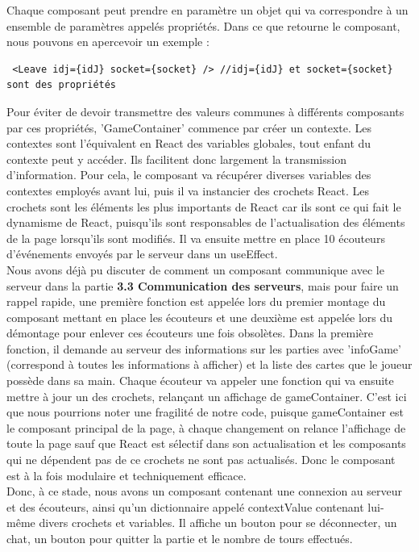\documentclass[a4paper]{article}
\begin{document}
Chaque composant peut prendre en paramètre un objet qui va correspondre à un ensemble de paramètres appelés propriétés. Dans ce que retourne le composant, nous pouvons en apercevoir un exemple :
\begin{verbatim}
 <Leave idj={idJ} socket={socket} /> //idj={idJ} et socket={socket} sont des propriétés
\end{verbatim}

Pour éviter de devoir transmettre des valeurs communes à différents composants par ces propriétés, 'GameContainer' commence par créer un contexte. Les contextes sont l'équivalent en React des variables globales, tout enfant du contexte peut y accéder. Ils facilitent donc largement la transmission d'information. Pour cela, le composant va récupérer diverses variables des contextes employés avant lui, puis il va instancier des crochets React. Les crochets sont les éléments les plus importants de React car ils sont ce qui fait le dynamisme de React, puisqu'ils sont responsables de l'actualisation des éléments de la page lorsqu'ils sont modifiés. Il va ensuite mettre en place 10 écouteurs d'événements envoyés par le serveur dans un useEffect.\\

Nous avons déjà pu discuter de comment un composant communique avec le serveur dans la partie \textbf{3.3 Communication des serveurs}, mais pour faire un rappel rapide, une première fonction est appelée lors du premier montage du composant mettant en place les écouteurs et une deuxième est appelée lors du démontage pour enlever ces écouteurs une fois obsolètes. Dans la première fonction, il demande au serveur des informations sur les parties avec 'infoGame' (correspond à toutes les informations à afficher) et la liste des cartes que le joueur possède dans sa main. Chaque écouteur va appeler une fonction qui va ensuite mettre à jour un des crochets, relançant un affichage de gameContainer. C'est ici que nous pourrions noter une fragilité de notre code, puisque gameContainer est le composant principal de la page, à chaque changement on relance l'affichage de toute la page sauf que React est sélectif dans son actualisation et les composants qui ne dépendent pas de ce crochets ne sont pas actualisés. Donc le composant est à la fois modulaire et techniquement efficace.\\

Donc, à ce stade, nous avons un composant contenant une connexion au serveur et des écouteurs, ainsi qu'un dictionnaire appelé contextValue contenant lui-même divers crochets et variables. Il affiche un bouton pour se déconnecter, un chat, un bouton pour quitter la partie et le nombre de tours effectués.\\
\end{document}
